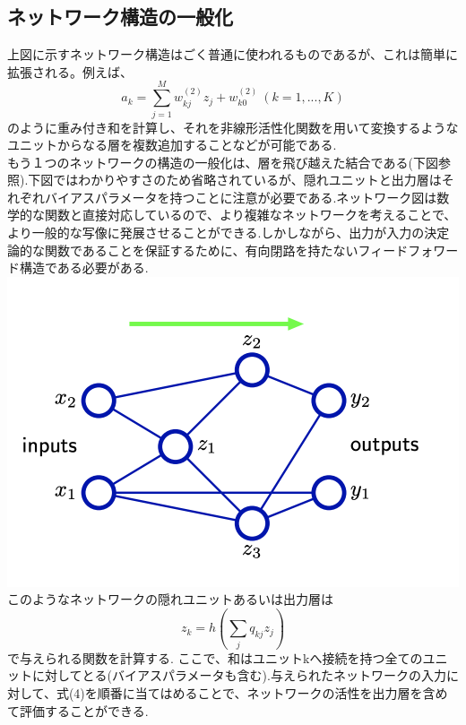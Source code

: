\documentclass[11pt,a4paper]{jsarticle}
\begin{document}
\subsection*{ネットワーク構造の一般化}
上図に示すネットワーク構造はごく普通に使われるものであるが、これは簡単に拡張される。例えば、\\
\begin{equation}
  a_k = \sum_{j=1}^M w_{kj}^{(2)} z_j + w_{k0}^{(2)} ~ (k = 1,...,K)
\end{equation}
のように重み付き和を計算し、それを非線形活性化関数を用いて変換するようなユニットからなる層を複数追加することなどが可能である.\\もう１つのネットワークの構造の一般化は、層を飛び越えた結合である(下図参照).下図ではわかりやすさのため省略されているが、隠れユニットと出力層はそれぞれバイアスパラメータを持つことに注意が必要である.ネットワーク図は数学的な関数と直接対応しているので、より複雑なネットワークを考えることで、より一般的な写像に発展させることができる.しかしながら、出力が入力の決定論的な関数であることを保証するために、有向閉路を持たないフィードフォワード構造である必要がある.\\
\includegraphics[scale=0.4]{jump.png}
\\このようなネットワークの隠れユニットあるいは出力層は\\
\begin{equation}
z_k = h(\sum_{j} q_{kj} z_j)
\end{equation}
で与えられる関数を計算する. ここで、和はユニットkへ接続を持つ全てのユニットに対してとる(バイアスパラメータも含む).与えられたネットワークの入力に対して、式(4)を順番に当てはめることで、ネットワークの活性を出力層を含めて評価することができる.\\
\end{document}
